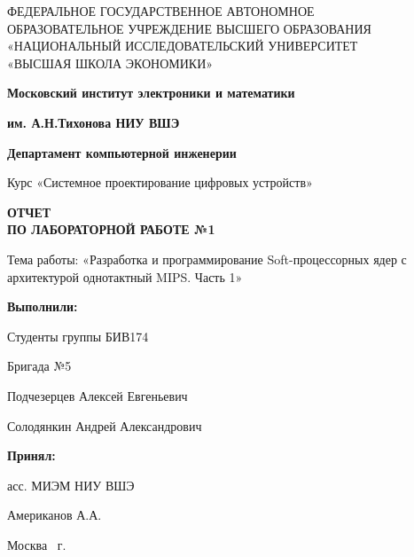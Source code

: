 \begin{titlepage}
	\begin{center}
 		ФЕДЕРАЛЬНОЕ  ГОСУДАРСТВЕННОЕ АВТОНОМНОЕ \\
		ОБРАЗОВАТЕЛЬНОЕ УЧРЕЖДЕНИЕ ВЫСШЕГО ОБРАЗОВАНИЯ\\
		«НАЦИОНАЛЬНЫЙ ИССЛЕДОВАТЕЛЬСКИЙ УНИВЕРСИТЕТ\\
		«ВЫСШАЯ ШКОЛА ЭКОНОМИКИ»
	\end{center}
	
	\begin{center}
		\textbf{Московский институт электроники и математики}
		
		\textbf{им. А.Н.Тихонова НИУ ВШЭ}
		
		\vspace{2ex}
		
		\textbf{Департамент компьютерной инженерии}
	\end{center}
	\vspace{1ex}	
	
	\begin{center}
		Курс «Системное проектирование цифровых устройств»
	\end{center}	
	
	
	\begin{center}
	\textbf{ОТЧЕТ\\
		ПО ЛАБОРАТОРНОЙ РАБОТЕ №1
	}
	\end{center}	

	\begin{center}
		Тема работы: «Разработка и программирование Soft-процессорных ядер с архитектурой однотактный MIPS. Часть 1»
	\end{center}

	\vspace{2ex}

	\begin{flushright}
		\textbf{Выполнили:}
		
		\vspace{2ex}
		
		Студенты группы БИВ174
		
		Бригада №5
		
		\vspace{2ex}
		
		Подчезерцев Алексей Евгеньевич
		
		Солодянкин Андрей Александрович
		\vspace{2ex}
		
		\textbf{Принял:}
		
		асс. МИЭМ НИУ ВШЭ
		
		Американов А.А.
		
	\end{flushright}

	\vfill
	\begin{center}
		Москва \the\year \, г.
	\end{center}
	
\end{titlepage}
\addtocounter{page}{1}